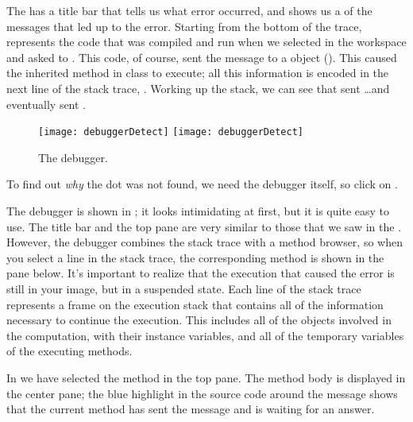 \documentclass[a4paper,10pt,twoside]{book}
\begin{document}
The  has a title bar that tells us what error occurred, and shows us a  of the messages that led up to the error.
Starting from the bottom of the trace,  represents the code that was compiled and run when we selected  in the workspace and asked \sq to .
This code, of course, sent the message  to a  object ().
This caused the inherited  method in class  to execute; all this information is encoded in the next line of the stack trace, .
Working up the stack, we can see that  sent \ldots and eventually  sent .

\begin{figure}[btp]
	\begin{center}
	\ifluluelse
		{\texttt{[image: debuggerDetect]}}
		{\texttt{[image: debuggerDetect]}}
	\end{center}
	\caption{The debugger.}
	\label{fig:debuggerDetect}
\end{figure}

To find out \emph{why} the dot was not found, we need the debugger itself, so click on .


The debugger is shown in ; it looks intimidating at first, but it is quite easy to use.
The title bar and the top pane are very similar to those that we saw in the .
However, the debugger combines the stack trace with a method browser, so when you select a line in the stack trace, the corresponding method is shown in the pane below.
It's important to realize that the execution that caused the error is still in your image, but in a suspended state.
Each line of the stack trace represents a frame on the execution stack that contains all of the information necessary to continue the execution.
This includes all of the objects involved in the computation, with their instance variables, and all of the temporary variables of the executing methods.

In  we have selected the  method in the top pane.
The method body is displayed in the center pane; the blue highlight in the source code around the message  shows that the current method has sent the message  and is waiting for an answer.
\end{document}
